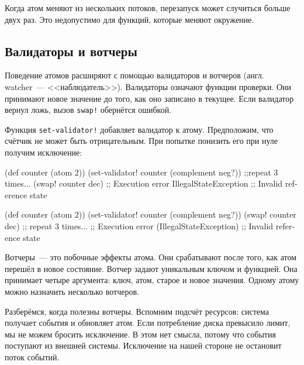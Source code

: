 Когда атом меняют из нескольких потоков, перезапуск может случиться больше двух
раз. Это недопустимо для функций, которые меняют окружение.

\subsection{Валидаторы и вотчеры}


Поведение атомов расширяют с помощью валидаторов и вотчеров (англ. watcher~---
<<наблюдатель>>). Валидаторы означают функции проверки. Они принимают новое
значение до того, как оно записано в текущее. Если валидатор вернул ложь, вызов
\verb|swap!| обернётся ошибкой.


Функция \verb|set-validator!| добавляет валидатор к атому. Предположим, что
счётчик не может быть отрицательным. При попытке понизить его при нуле получим
исключение:

\ifnarrow

\begin{english}
  \begin{clojure}
(def counter (atom 2))
(set-validator!
  counter (complement neg?))
;;repeat 3 times...
(swap! counter dec)
;; Execution error IllegalStateException
;; Invalid reference state
  \end{clojure}
\end{english}

\else

\begin{english}
  \begin{clojure}
(def counter (atom 2))
(set-validator! counter (complement neg?))
(swap! counter dec) ;; repeat 3 times...
;; Execution error (IllegalStateException)
;; Invalid reference state
  \end{clojure}
\end{english}

\fi

Вотчеры~--- это побочные эффекты атома. Они срабатывают после того, как атом
перешёл в новое состояние. Вотчер задают уникальным ключом и функцией. Она
принимает четыре аргумента: ключ, атом, старое и новое значения. Одному атому
можно назначить несколько вотчеров.

Разберёмся, когда полезны вотчеры. Вспомним подсчёт ресурсов: система получает
события и обновляет атом. Если потребление диска превысило лимит, мы не можем
бросить исключение. В этом нет смысла, потому что события поступают из внешней
системы. Исключение на нашей стороне не остановит поток событий.


